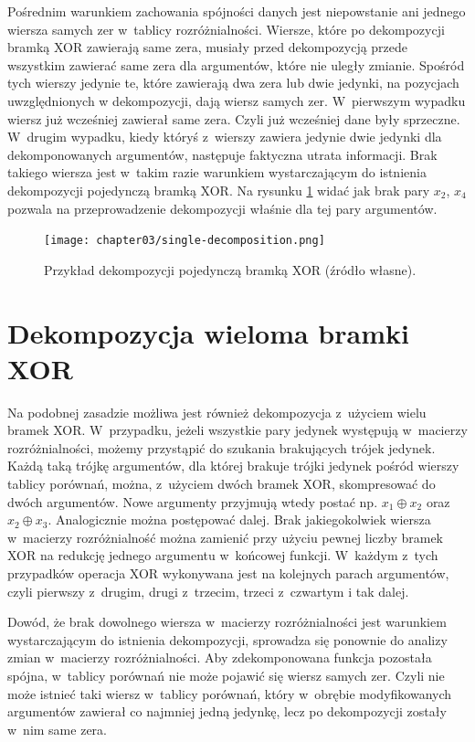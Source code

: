 Pośrednim warunkiem zachowania spójności danych jest niepowstanie ani jednego wiersza samych zer w~tablicy rozróżnialności.
Wiersze,
które po dekompozycji bramką XOR zawierają same zera,
musiały przed dekompozycją przede wszystkim zawierać same zera dla argumentów,
które nie uległy zmianie.
Spośród tych wierszy jedynie te,
które zawierają dwa zera lub dwie jedynki,
na pozycjach uwzględnionych w dekompozycji,
dają wiersz samych zer.
W~pierwszym wypadku wiersz już wcześniej zawierał same zera.
Czyli już wcześniej dane były sprzeczne.
W~drugim wypadku,
kiedy któryś z~wierszy zawiera jedynie dwie jedynki dla dekomponowanych argumentów,
następuje faktyczna utrata informacji.
Brak takiego wiersza jest w~takim razie warunkiem wystarczającym do istnienia dekompozycji pojedynczą bramką XOR.
Na rysunku \ref{fig:single-decomposition} widać jak brak pary $x_2$, $x_4$ pozwala na przeprowadzenie dekompozycji właśnie dla tej pary argumentów.

\begin{figure}[H]
\centering
\texttt{[image: chapter03/single-decomposition.png]}
\caption{Przykład dekompozycji pojedynczą bramką XOR (źródło własne).}
\label{fig:single-decomposition}
\end{figure}

\section{Dekompozycja wieloma bramki XOR}

Na podobnej zasadzie możliwa jest również dekompozycja z~użyciem wielu bramek XOR.
W~przypadku,
jeżeli wszystkie pary jedynek występują w~macierzy rozróżnialności,
możemy przystąpić do szukania brakujących trójek jedynek.
Każdą taką trójkę argumentów,
dla której brakuje trójki jedynek pośród wierszy tablicy porównań,
można, z~użyciem dwóch bramek XOR,
skompresować do dwóch argumentów.
Nowe argumenty przyjmują wtedy postać np. $x_1 \oplus x_2$ oraz $x_2 \oplus x_3$.
Analogicznie można postępować dalej.
Brak jakiegokolwiek wiersza w~macierzy rozróżnialność można zamienić przy użyciu pewnej liczby bramek XOR na redukcję jednego argumentu w~końcowej funkcji.
W~każdym z~tych przypadków operacja XOR wykonywana jest na kolejnych parach argumentów,
czyli pierwszy z~drugim,
drugi z~trzecim,
trzeci z~czwartym i tak dalej.

Dowód,
że brak dowolnego wiersza w~macierzy rozróżnialności jest warunkiem wystarczającym do istnienia dekompozycji,
sprowadza się ponownie do analizy zmian w~macierzy rozróżnialności.
Aby zdekomponowana funkcja pozostała spójna,
w~tablicy porównań nie może pojawić się wiersz samych zer.
Czyli nie może istnieć taki wiersz w~tablicy porównań,
który w~obrębie modyfikowanych argumentów zawierał co najmniej jedną jedynkę,
lecz po dekompozycji zostały w~nim same zera.

